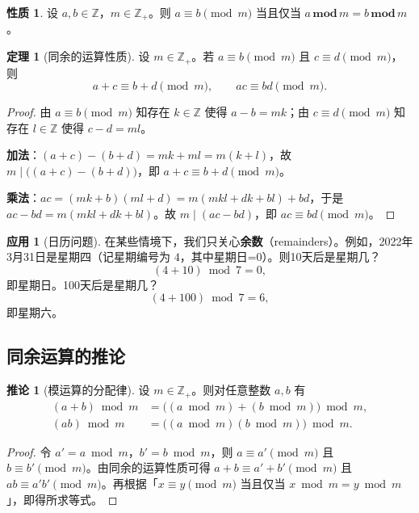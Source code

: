 \documentclass[UTF8,11pt,a4paper]{ctexbook}   %
\theoremstyle{definition}
\newtheorem{theorem}{定理}[section]
\newtheorem{property}{性质}[section]
\newtheorem{application}{应用}[section]
\newtheorem{corollary}{推论}[section]
\begin{document}
\begin{property}
设 $a,b\in\mathbb{Z}$，$m\in\mathbb{Z}_+$。则 $a\equiv b\pmod{m}$ 当且仅当 $a\,\mathbf{mod}\,m = b\,\mathbf{mod}\,m$。
\end{property}

\begin{theorem}[同余的运算性质]
设 $m\in\mathbb{Z}_+$。若 $a\equiv b\pmod{m}$ 且 $c\equiv d\pmod{m}$，则
\[ a+c\equiv b+d\pmod{m},\qquad ac\equiv bd\pmod{m}. \]
\end{theorem}

\begin{proof}
由 $a\equiv b\pmod{m}$ 知存在 $k\in\mathbb{Z}$ 使得 $a-b=mk$；由 $c\equiv d\pmod{m}$ 知存在 $l\in\mathbb{Z}$ 使得 $c-d=ml$。

\textbf{加法}：$(a+c)-(b+d) = mk+ml = m(k+l)$，故 $m\mid\bigl((a+c)-(b+d)\bigr)$，即 $a+c\equiv b+d\pmod{m}$。

\textbf{乘法}：$ac = (mk+b)(ml+d) = m(mkl+dk+bl)+bd$，于是 $ac-bd = m(mkl+dk+bl)$。故 $m\mid(ac-bd)$，即 $ac\equiv bd\pmod{m}$。
\end{proof}

\begin{application}[日历问题]
在某些情境下，我们只关心\textbf{余数}（remainders）。例如，2022年3月31日是星期四（记星期编号为 $4$，其中星期日=0）。则10天后是星期几？
\[ (4+10)\bmod 7 = 0, \]
即星期日。100天后是星期几？
\[ (4+100)\bmod 7 = 6, \]
即星期六。
\end{application}


\subsection{同余运算的推论}

\begin{corollary}[模运算的分配律]
设 $m\in\mathbb{Z}_+$。则对任意整数 $a,b$ 有
\begin{align*}
(a+b)\bmod m &= \bigl((a\bmod m)+(b\bmod m)\bigr)\bmod m,\\[0.3em]
(ab)\bmod m &= \bigl((a\bmod m)(b\bmod m)\bigr)\bmod m.
\end{align*}
\end{corollary}

\begin{proof}
令 $a' = a\bmod m$，$b' = b\bmod m$，则 $a\equiv a'\pmod m$ 且 $b\equiv b'\pmod m$。由同余的运算性质可得 $a+b\equiv a'+b'\pmod m$ 且 $ab\equiv a'b'\pmod m$。再根据「$x\equiv y\pmod m$ 当且仅当 $x\bmod m = y\bmod m$」，即得所求等式。
\end{proof}
\end{document}
